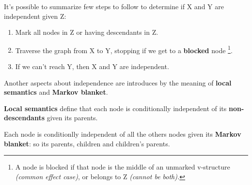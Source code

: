 It's possible to summarize few steps to follow to determine if X and Y are independent given Z:
\begin{enumerate}
    \item Mark all nodes in Z or having descendants in Z.
    \item Traverse the graph from X to Y, stopping if we get to a \textbf{blocked} node \footnote{A node is blocked if that node is the middle of an unmarked v-structure \textit{(common effect case)}, or belongs to Z \textit{(cannot be both).}}.
    \item If we can't reach Y, then X and Y are independent.
\end{enumerate}
Another aspects about independence are introduces by the meaning of \textbf{local semantics} and \textbf{Markov blanket}.
\begin{definition}
    \textbf{Local semantics} define that each node is conditionally independent of its \textbf{non-descendants} given its parents. 
\end{definition}
\begin{definition}
    Each node is conditionlly independent of all the others nodes given its \textbf{Markov blanket}: so its parents, children and children's parents.
\end{definition}
